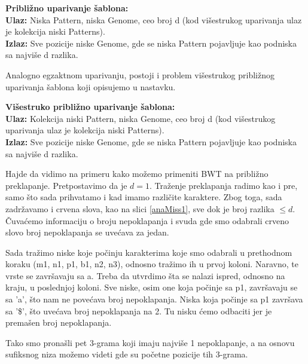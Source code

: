 \begin{tcolorbox}
	\textbf{Približno uparivanje šablona:}\\
	\textbf{Ulaz:} Niska Pattern, niska Genome, ceo broj d (kod višestrukog uparivanja ulaz je kolekcija niski Patterns).\\
	\textbf{Izlaz:} Sve pozicije niske Genome, gde se niska Pattern pojavljuje kao podniska sa najviše d razlika.
\end{tcolorbox}

Analogno egzaktnom uparivanju, postoji i problem višestrukog približnog uparivanja šablona koji opisujemo u nastavku. 


\begin{tcolorbox}
	\textbf{Višestruko približno uparivanje šablona:} \\
	\textbf{Ulaz:} Kolekcija niski Pattern, niska Genome, ceo broj d (kod višestrukog uparivanja ulaz je kolekcija niski Patterns). \\
	\textbf{Izlaz:} Sve pozicije niske Genome, gde se niska Pattern pojavljuje kao podniska sa najviše d razlika.
\end{tcolorbox}


Hajde da vidimo na primeru kako možemo primeniti BWT na približno preklapanje.  Pretpostavimo da je $d=1$. Traženje preklapanja radimo kao i pre, samo što sada prihvatamo i kad imamo različite karaktere. Zbog toga, sada zadržavamo i crvena slova, kao na slici \ref{anaMiss1}, sve dok je broj razlika $\leq d$. Čuvaćemo informaciju o broju nepoklapanja i svuda gde smo odabrali crveno slovo broj nepoklapanja se uvećava za jedan. 

Sada tražimo niske koje počinju karakterima koje smo odabrali u prethodnom koraku (m1, n1, p1, b1, n2, n3), odnosno tražimo ih u prvoj koloni. Naravno, te vrste se završavaju sa a. Treba da utvrdimo šta se nalazi ispred, odnosno na kraju, u poslednjoj koloni. Sve niske, osim one koja počinje sa p1, završavaju se sa 'a', što nam ne povećava broj nepoklapanja. Niska koja počinje sa p1 završava sa '\$', što uvećava broj nepoklapanja na 2. Tu nisku ćemo odbaciti jer je premašen broj nepoklapanja. 

Tako smo pronašli pet 3-grama koji imaju najviše 1 nepoklapanje, a na osnovu sufiksnog niza možemo videti gde su početne pozicije tih 3-grama.


